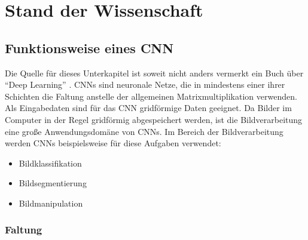 \chapter{Stand der Wissenschaft}

\section{Funktionsweise eines CNN}\label{sec:conv}
Die Quelle für dieses Unterkapitel ist soweit nicht anders vermerkt ein Buch über \enquote{Deep Learning} \cite{CNNBook}.
CNNs sind neuronale Netze, die in mindestens einer ihrer Schichten die Faltung anstelle der allgemeinen Matrixmultiplikation verwenden. Als Eingabedaten sind für das CNN gridförmige Daten geeignet. Da Bilder im Computer in der Regel gridförmig abgespeichert werden, ist die Bildverarbeitung eine große Anwendungsdomäne von CNNs. Im Bereich der Bildverarbeitung werden CNNs beispielsweise für diese Aufgaben verwendet:

\begin{itemize}
 \item Bildklassifikation
 \item Bildsegmentierung
 \item Bildmanipulation
\end{itemize}


\subsection{Faltung}



